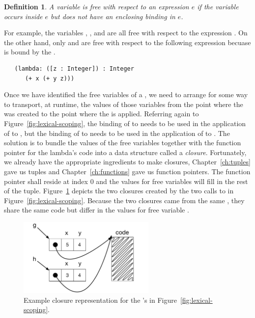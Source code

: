 \documentclass[11pt]{book}
\newtheorem{definition}[theorem]{Definition}
\begin{document}
\begin{definition}
A variable is \emph{free with respect to an expression} $e$ if the
variable occurs inside $e$ but does not have an enclosing binding in
$e$.
\end{definition}

For example, the variables , , and  are all
free with respect to the expression .  On the
other hand, only  and  are free with respect to the
following expression becuase  is bound by the .
\begin{lstlisting}
   (lambda: ([z : Integer]) : Integer
      (+ x (+ y z)))
\end{lstlisting}

Once we have identified the free variables of a , we need
to arrange for some way to transport, at runtime, the values of those
variables from the point where the  was created to the
point where the  is applied. Referring again to
Figure~\ref{fig:lexical-scoping}, the binding of  to 
needs to be used in the application of  to , but the
binding of  to  needs to be used in the application of
 to . The solution is to bundle the values of the
free variables together with the function pointer for the lambda's
code into a data structure called a \emph{closure}. Fortunately, we
already have the appropriate ingredients to make closures,
Chapter~\ref{ch:tuples} gave us tuples and Chapter~\ref{ch:functions}
gave us function pointers. The function pointer shall reside at index
$0$ and the values for free variables will fill in the rest of the
tuple. Figure~\ref{fig:closures} depicts the two closures created by
the two calls to  in Figure~\ref{fig:lexical-scoping}.
Because the two closures came from the same , they share
the same code but differ in the values for free variable .

\begin{figure}[tbp]
\centering \includegraphics[width=0.6\textwidth]{figs/closures}
\caption{Example closure representation for the 's
  in Figure~\ref{fig:lexical-scoping}.}
\label{fig:closures}
\end{figure}
\end{document}
